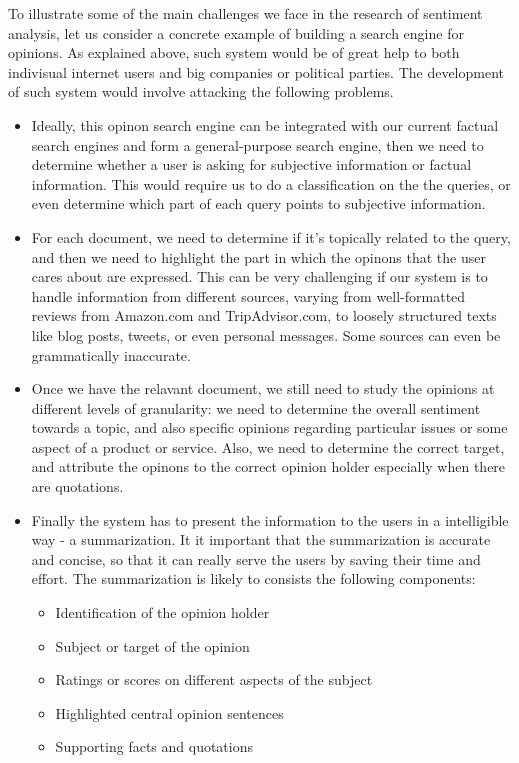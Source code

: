 To illustrate some of the main challenges we face in the research of sentiment analysis, let us consider a concrete example of building a search engine for opinions. As explained above, such system would be of great help to both indivisual internet users and big companies or political parties. The development of such system would involve attacking the following problems.

\begin{itemize}
	\item Ideally, this opinon search engine can be integrated with our current factual search engines and form a general-purpose search engine, then we need to determine whether a user is asking for subjective information or factual information. This would require us to do a classification on the the queries, or even determine which part of each query points to subjective information.
	\item For each document, we need to determine if it's topically related to the query, and then we need to highlight the part in which the opinons that the user cares about are expressed. This can be very challenging if our system is to handle information from different sources, varying from well-formatted reviews from Amazon.com and TripAdvisor.com, to loosely structured texts like blog posts, tweets, or even personal messages. Some sources can even be grammatically inaccurate.
	\item Once we have the relavant document, we still need to study the opinions at different levels of granularity: we need to determine the overall sentiment towards a topic, and also specific opinions regarding particular issues or some aspect of a product or service. Also, we need to determine the correct target, and attribute the opinons to the correct opinion holder especially when there are quotations. 
	\item Finally the system has to present the information to the users in a intelligible way - a summarization. It it important that the summarization is accurate and concise, so that it can really serve the users by saving their time and effort. The summarization is likely to consists the following components:
    \begin{itemize}
        \item Identification of the opinion holder
	    \item Subject or target of the opinion
	    \item Ratings or scores on different aspects of the subject
	    \item Highlighted central opinion sentences
	    \item Supporting facts and quotations
    \end{itemize}
\end{itemize}

